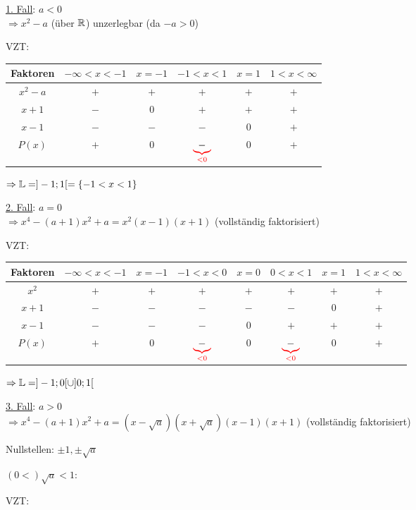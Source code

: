 \begin{enumerate}[A)]
\begin{enumerate}[1.]
		\ul{1. Fall}: $a<0$\\
		$\Rightarrow x^2-a$ (über $\mathbb{R}$) unzerlegbar (da $-a>0$)
		
		VZT:\\
		\begin{tabular}{c|c|c|c|c|c}
			Faktoren & $-\infty<x<-1$ & $x=-1$ & $-1<x<1$ & $x=1$ & $1<x<\infty$\\
			\hline
			$x^2-a$ & $+$ & $+$ & $+$ & $+$ & $+$ \\
			$x + 1$ & $-$ & $0$ & $+$ & $+$ & $+$ \\
			$x - 1$ & $-$ & $-$ & $-$ & $0$ & $+$ \\
			\hline
			$P(x)$ & $+$ & $0$ & $\textcolor{red}{\underbrace{\textcolor{black}{-}}_{<0}}$ & $0$ & $+$ \\
		\end{tabular}
		
		$\Rightarrow \mathbb{L}=]-1;1[ =\{-1<x<1\}$
		
		\ul{2. Fall}: $a=0$\\
		$\Rightarrow x^4-(a+1)x^2+a = x^2(x-1)(x+1)$ (vollständig faktorisiert)
		
		VZT:\\
		\begin{tabular}{c|c|c|c|c|c|c|c}
			Faktoren & \parbox{38pt}{$-\infty<x<-1$} & $x=-1$ & $-1<x<0$ & $x=0$ & $0<x<1$ & $x=1$ & \parbox{38pt}{$1<x<\infty$}\\
			\hline
			$x^2$ & $+$ & $+$ & $+$ & $+$ & $+$ & $+$ & $+$ \\
			$x + 1$ & $-$ & $-$ & $-$ & $-$ & $-$ & $0$ & $+$ \\
			$x - 1$ & $-$ & $-$ & $-$ & $0$ & $+$ & $+$ & $+$ \\
			\hline
			$P(x)$ & $+$ & $0$ & $\textcolor{red}{\underbrace{\textcolor{black}{-}}_{<0}}$ & $0$ & $\textcolor{red}{\underbrace{\textcolor{black}{-}}_{<0}}$ & $0$ & $+$ \\
		\end{tabular}
		
		$\Rightarrow \mathbb{L}=]-1;0[ \cup ]0;1[$
		
		\ul{3. Fall}: $a>0$\\
		$\Rightarrow x^4-(a+1)x^2+a = (x-\sqrt{a})(x+\sqrt{a})(x-1)(x+1)$ (vollständig faktorisiert)
		
		Nullstellen: $\pm1, \pm \sqrt{a}$
		
		\ul{$(0<)\sqrt{a}<1$}:
		
		VZT:
		

\end{enumerate}
\end{enumerate}
